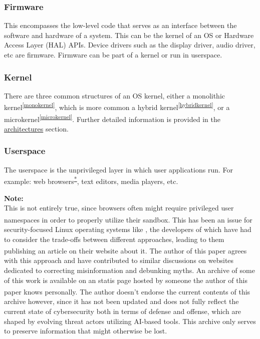 \documentclass[a4paper,12pt]{report}
\begin{document}
\subsubsection{Firmware}
This encompasses the low-level code that serves as an interface between the software and hardware of a system. This can be the kernel of an OS or Hardware Access Layer (HAL) APIs. Device drivers such as the display driver, audio driver, etc are firmware. Firmware can be part of a kernel or run in userspace.

\subsubsection{Kernel}
There are three common structures of an OS kernel, either a  monolithic kernel\textsuperscript{\ref{monokernel}}, which is more common a hybrid kernel\textsuperscript{\ref{hybridkernel}}, or a microkernel\textsuperscript{\ref{microkernel}}. Further detailed information is provided in the \hyperref[arches]{architectures} section.
\subsubsection{Userspace}
The userspace is the unprivileged layer in which user applications run. For example: web browsers\textsuperscript{\hyperref[browsers-note]{*}}, text editors, media players, etc.

\textbf{Note:}\\
\label{browsers-note}
This is not entirely true, since browsers often might require privileged user namespaces\textsuperscript{\citep{userns}} in order to properly utilize their sandbox. This has been an issue for security-focused Linux operating systems like \citeauthor{secureblue}, the developers of which have had to consider the trade-offs between different approaches, leading to them publishing an article on their website about it.\textsuperscript{\citep{secureblue-userns}} The author of this paper agrees with this approach and have contributed to similar discussions on websites dedicated to correcting misinformation and debunking myths. An archive of some of this work is available on an statis page hosted by someone the author of this paper knows personally.\textsuperscript{\citep{security-advice}} The author doesn't endorse the current contents of this archive however, since it has not been updated and does not fully reflect the current state of cybersecurity both in terms of defense and offense, which are shaped by evolving threat actors utilizing AI-based tools. This archive only serves to preserve information that might otherwise be lost. 
\end{document}
